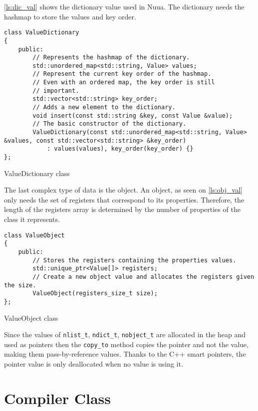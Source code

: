 \autoref{ls:dic_val} shows the dictionary value used in Nuua. The dictionary needs the hashmap to store the values and key order.

\begin{listing}[H]
\begin{verbatim}
class ValueDictionary
{
    public:
        // Represents the hashmap of the dictionary.
        std::unordered_map<std::string, Value> values;
        // Represent the current key order of the hashmap.
        // Even with an ordered map, the key order is still
        // important.
        std::vector<std::string> key_order;
        // Adds a new element to the dictionary.
        void insert(const std::string &key, const Value &value);
        // The basic constructor of the dictionary.
        ValueDictionary(const std::unordered_map<std::string, Value> &values, const std::vector<std::string> &key_order)
            : values(values), key_order(key_order) {}
};
\end{verbatim}
\caption{ValueDictionary class}
\label{ls:dic_val}
\end{listing}

The last complex type of data is the object. An object, as seen on \autoref{ls:obj_val} only needs the set of registers that
correspond to its properties. Therefore, the length of the registers array is determined by the number of properties of the class
it represents.

\begin{listing}[H]
\begin{verbatim}
class ValueObject
{
    public:
        // Stores the registers containing the properties values.
        std::unique_ptr<Value[]> registers;
        // Create a new object value and allocates the registers given the size.
        ValueObject(registers_size_t size);
};
\end{verbatim}
\caption{ValueObject class}
\label{ls:obj_val}
\end{listing}

Since the values of \texttt{nlist\_t}, \texttt{ndict\_t}, \texttt{nobject\_t} are allocated in the heap and used as pointers
then the \texttt{copy\_to} method copies the pointer and not the value, making them pass-by-reference values.
Thanks to the C++ smart pointers, the pointer value is only deallocated when no value is using it.

\section{Compiler Class}

